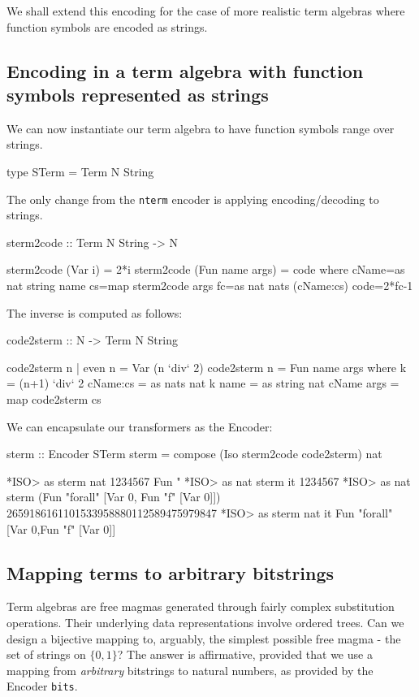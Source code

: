 \documentclass[]{INCLUDES/llncs}
\begin{document}
We shall extend this encoding for the case of more realistic term
algebras where function symbols are encoded as strings.

\subsection{Encoding in a term algebra with function symbols represented as
strings}

We can now instantiate our term algebra to have function symbols range over
strings.
\begin{code}
type STerm = Term N String
\end{code}
The only change from the {\tt nterm} encoder is applying encoding/decoding to
strings.
\begin{code}
sterm2code :: Term N String -> N

sterm2code (Var i) = 2*i
sterm2code (Fun name args) = code where
  cName=as nat string name
  cs=map sterm2code args
  fc=as nat nats (cName:cs)
  code=2*fc-1
\end{code}
The inverse is computed as follows:
\begin{code}
code2sterm :: N -> Term N String

code2sterm n | even n = Var (n `div` 2) 
code2sterm n = Fun name args where
  k = (n+1) `div` 2
  cName:cs = as nats nat k
  name = as string nat cName
  args = map code2sterm cs
\end{code}

We can encapsulate our transformers as the Encoder:
\begin{code}
sterm :: Encoder STerm
sterm = compose (Iso sterm2code code2sterm) nat
\end{code}

\begin{codex}
*ISO> as sterm nat 1234567
Fun "%
*ISO> as nat sterm it
1234567
*ISO> as nat sterm (Fun "forall" [Var 0, Fun "f" [Var 0]])
2659186161101533958880112589475979847
*ISO> as sterm nat it
Fun "forall" [Var 0,Fun "f" [Var 0]]
\end{codex}

\subsection{Mapping terms to arbitrary bitstrings}

Term algebras are free magmas generated through fairly complex
substitution operations. Their underlying data representations involve ordered
trees. Can we design a bijective mapping to, arguably, the simplest possible free
magma - the set of strings on $\{0,1\}$?  The answer is affirmative, provided
that we use a mapping from {\em arbitrary} bitstrings to natural numbers, as
provided by the Encoder {\tt bits}.
\end{document}
